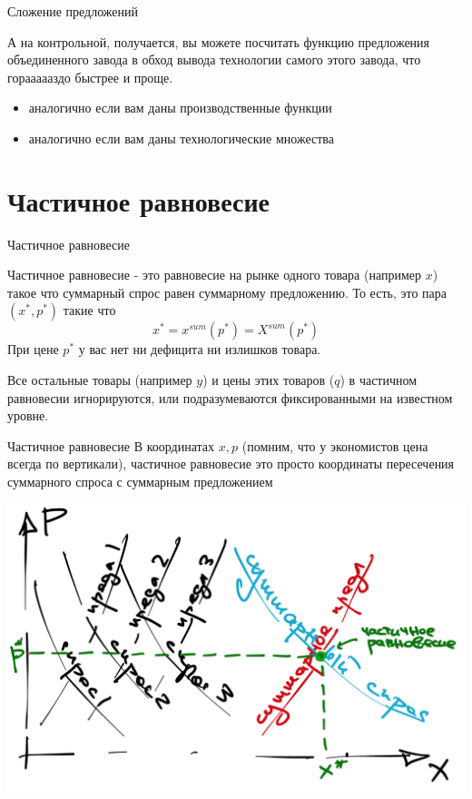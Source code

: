\documentclass{beamer}
\begin{document}
\begin{frame}{Сложение предложений}

А на контрольной, получается, \alert{вы можете посчитать функцию предложения объединенного завода в обход вывода технологии самого этого завода}, что гораааааздо быстрее и проще.

\begin{itemize}
  \item аналогично если вам даны производственные функции
  \item аналогично если вам даны технологические множества 
\end{itemize}

\end{frame}

\section{Частичное равновесие}

\begin{frame}{Частичное равновесие}

\alert{Частичное равновесие} - это равновесие на рынке одного товара (например $x$) такое что суммарный спрос равен суммарному предложению. То есть, это пара $(x^{\ast}, p^{\ast})$ такие что 
$$ x^{\ast} = x^{sum}(p^{\ast}) = X^{sum}(p^{\ast})$$
При цене $p^{\ast}$ у вас нет ни дефицита ни излишков товара.

Все остальные товары (например $y$) и цены этих товаров ($q$) в частичном равновесии игнорируются, или подразумеваются фиксированными на известном уровне.

\end{frame}

\begin{frame}{Частичное равновесие}
В координатах $x,p$ (помним, что у экономистов цена всегда по вертикали), частичное равновесие это просто координаты пересечения суммарного спроса с суммарным предложением
    \begin{center}
     \includegraphics[width=.8\textwidth]{partial}
     \end{center}
\end{frame}
\end{document}
